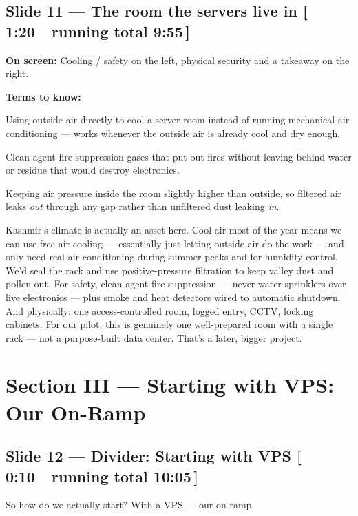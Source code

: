 \documentclass[11pt]{article}
\newcommand{\onscreen}[1]{\noindent\textbf{\color{sovGrey}On screen:} #1\par\vspace{4pt}}
\newcommand{\timing}[2]{\hfill{\normalsize\color{sovGrey}[\,#1\ \textbar\ running total #2\,]}}
\newenvironment{terms}
  {\noindent\textbf{\color{sovGrey}Terms to know:}
   \begin{description}[leftmargin=0pt,style=sameline,labelindent=0pt,itemsep=2pt,topsep=2pt,font=\normalfont\bfseries\color{sovDark}]}
  {\end{description}\vspace{2pt}}
\begin{document}
\subsection*{Slide 11 --- The room the servers live in \timing{1:20}{9:55}}
\onscreen{Cooling / safety on the left, physical security and a takeaway on the right.}
\begin{terms}
  \item[Free-air / economizer cooling] Using outside air directly to cool a server
    room instead of running mechanical air-conditioning --- works whenever the outside
    air is already cool and dry enough.
  \item[FM-200 / Novec] Clean-agent fire suppression gases that put out fires without
    leaving behind water or residue that would destroy electronics.
  \item[Positive-pressure filtration] Keeping air pressure inside the room slightly
    higher than outside, so filtered air leaks \emph{out} through any gap rather than
    unfiltered dust leaking \emph{in}.
\end{terms}
\begin{sayit}
Kashmir's climate is actually an asset here. Cool air most of the year means we can use
free-air cooling --- essentially just letting outside air do the work --- and only need
real air-conditioning during summer peaks and for humidity control. We'd seal the rack
and use positive-pressure filtration to keep valley dust and pollen out. For safety,
clean-agent fire suppression --- never water sprinklers over live electronics --- plus
smoke and heat detectors wired to automatic shutdown. And physically: one
access-controlled room, logged entry, CCTV, locking cabinets. For our pilot, this is
genuinely one well-prepared room with a single rack --- not a purpose-built data center.
That's a later, bigger project.
\end{sayit}

\section{Section III --- Starting with VPS: Our On-Ramp}

\subsection*{Slide 12 --- Divider: Starting with VPS \timing{0:10}{10:05}}
\begin{sayit}
So how do we actually start? With a VPS --- our on-ramp.
\end{sayit}
\end{document}
